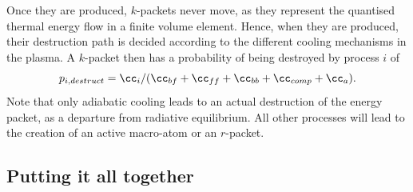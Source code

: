 Once they are produced, $k$-packets never move, as they represent the quantised
thermal energy flow in a finite volume element. Hence, when they are produced,
their destruction path is decided according to the different cooling mechanisms
in the plasma. A $k$-packet then has a probability of being destroyed by process $i$ of
\begin{equation}
p_{i,destruct} = \cc_i / (\cc_{bf} + \cc_{ff} + \cc_{bb} + \cc_{comp} + \cc_a).
\end{equation}
Note that only adiabatic cooling leads to an actual destruction of the energy packet,
as a departure from radiative equilibrium. All other processes will lead to the 
creation of an active macro-atom or an $r$-packet.



\subsection{Putting it all together}

